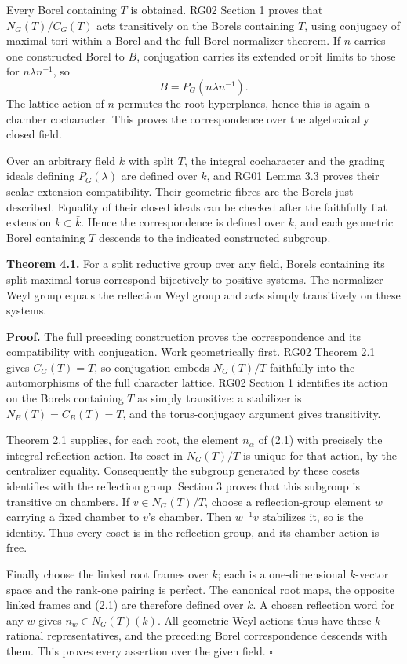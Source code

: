 \documentclass[11pt,a4paper,openany]{report}
\begin{document}
Every Borel containing \(T\) is obtained. RG02 Section 1 proves that \(N_G(T)/C_G(T)\) acts transitively on the Borels containing \(T\), using conjugacy of maximal tori within a Borel and the full Borel normalizer theorem. If \(n\) carries one constructed Borel to \(B\), conjugation carries its extended orbit limits to those for \(n\lambda n^{-1}\), so \[
                     B=P_G(n\lambda n^{-1}).
\] The lattice action of \(n\) permutes the root hyperplanes, hence this is again a chamber cocharacter. This proves the correspondence over the algebraically closed field.

Over an arbitrary field \(k\) with split \(T\), the integral cocharacter and the grading ideals defining \(P_G(\lambda)\) are defined over \(k\), and RG01 Lemma 3.3 proves their scalar-extension compatibility. Their geometric fibres are the Borels just described. Equality of their closed ideals can be checked after the faithfully flat extension \(k\subset\bar k\). Hence the correspondence is defined over \(k\), and each geometric Borel containing \(T\) descends to the indicated constructed subgroup.

\textbf{Theorem 4.1.} For a split reductive group over any field, Borels containing its split maximal torus correspond bijectively to positive systems. The normalizer Weyl group equals the reflection Weyl group and acts simply transitively on these systems.

\textbf{Proof.} The full preceding construction proves the correspondence and its compatibility with conjugation. Work geometrically first. RG02 Theorem 2.1 gives \(C_G(T)=T\), so conjugation embeds \(N_G(T)/T\) faithfully into the automorphisms of the full character lattice. RG02 Section 1 identifies its action on the Borels containing \(T\) as simply transitive: a stabilizer is \(N_B(T)=C_B(T)=T\), and the torus-conjugacy argument gives transitivity.

Theorem 2.1 supplies, for each root, the element \(n_\alpha\) of (2.1) with precisely the integral reflection action. Its coset in \(N_G(T)/T\) is unique for that action, by the centralizer equality. Consequently the subgroup generated by these cosets identifies with the reflection group. Section 3 proves that this subgroup is transitive on chambers. If \(v\in N_G(T)/T\), choose a reflection-group element \(w\) carrying a fixed chamber to \(v\)'s chamber. Then \(w^{-1}v\) stabilizes it, so is the identity. Thus every coset is in the reflection group, and its chamber action is free.

Finally choose the linked root frames over \(k\); each is a one-dimensional \(k\)-vector space and the rank-one pairing is perfect. The canonical root maps, the opposite linked frames and (2.1) are therefore defined over \(k\). A chosen reflection word for any \(w\) gives \(n_w\in N_G(T)(k)\). All geometric Weyl actions thus have these \(k\)-rational representatives, and the preceding Borel correspondence descends with them. This proves every assertion over the given field. \(\square\)
\end{document}
